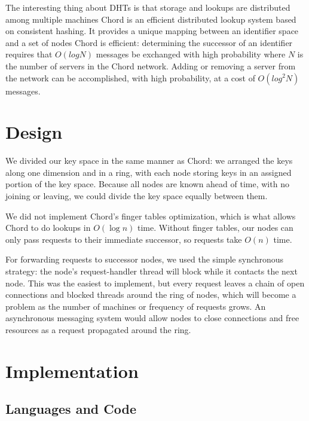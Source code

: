 \documentclass[11pt,conference]{IEEEtran}
\begin{document}
\fi

The interesting thing about DHTs is that storage and lookups are distributed among multiple machines \cite{linuxjournal_dht}
Chord is an efficient distributed lookup system based on consistent hashing. It provides a
unique mapping between an identifier space and a set of nodes \cite{chord}
\newline
Chord is efficient: determining the successor of an identifier requires that $O(log N)$ messages be exchanged with high probability where $N$ is the number of servers in the
Chord network. Adding or removing a server from the network
can be accomplished, with high probability, at a cost of $O(log^2 N)$ messages.
\cite{chord}
\fi


\section{Design}

We divided our key space in the same manner as Chord\cite{chord}: we arranged
the keys along one dimension and in a ring, with each node storing keys in an
assigned portion of the key space. Because all nodes are known ahead of time,
with no joining or leaving, we could divide the key space equally between them.

We did not implement Chord's finger tables optimization, which is what allows
Chord to do lookups in $O(\log n)$ time. Without finger tables, our nodes can
only pass requests to their immediate successor, so requests take $O(n)$ time.

For forwarding requests to successor nodes, we used the simple synchronous
strategy: the node's request-handler thread will block while it contacts the
next node. This was the easiest to implement, but every request leaves a chain
of open connections and blocked threads around the ring of nodes, which will
become a problem as the number of machines or frequency of requests grows. An
asynchronous messaging system would allow nodes to close connections and free
resources as a request propagated around the ring.




\section{Implementation}


\subsection{Languages and Code}
\end{document}
